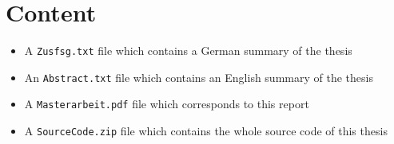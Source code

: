 \chapter{ Content}

\begin{itemize}
	\item A \texttt{Zusfsg.txt} file which contains a German summary of the thesis
	\item An \texttt{Abstract.txt} file which contains an English summary of the thesis
	\item A \texttt{Masterarbeit.pdf} file which corresponds to this report
	\item A \texttt{SourceCode.zip} file which contains the whole source code of this thesis
\end{itemize}